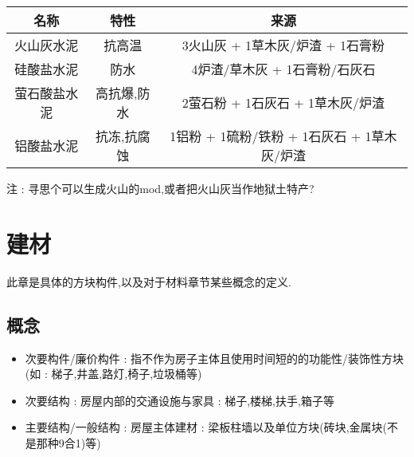 {{{          \begin{center}
              \begin{tabular}{|c|c|c|}
                  \hline
                  名称         & 特性        & 来源                                        \\
                  \hline
                  火山灰水泥   & 抗高温      & 3火山灰 + 1草木灰/炉渣 + 1石膏粉            \\
                  \hline
                  硅酸盐水泥   & 防水        & 4炉渣/草木灰 + 1石膏粉/石灰石               \\
                  \hline
                  萤石酸盐水泥 & 高抗爆,防水 & 2萤石粉 + 1石灰石 + 1草木灰/炉渣            \\
                  \hline
                  铝酸盐水泥   & 抗冻,抗腐蚀 & 1铝粉 + 1硫粉/铁粉 + 1石灰石 + 1草木灰/炉渣 \\
                  \hline
              \end{tabular}
          \end{center}

          注 : 寻思个可以生成火山的mod,或者把火山灰当作地狱土特产?
      }\label{cement}

  }
 }

\section{建材}{
  此章是具体的方块构件,以及对于材料章节某些概念的定义.

  \subsection{概念}{
      \begin{itemize}
          \item 次要构件/廉价构件 : 指不作为房子主体且使用时间短的的功能性/装饰性方块(如 : 梯子,井盖,路灯,椅子,垃圾桶等)
          \item 次要结构 : 房屋内部的交通设施与家具 : 梯子,楼梯,扶手,箱子等
          \item 主要结构/一般结构 : 房屋主体建材 : 梁板柱墙以及单位方块(砖块,金属块(不是那种9合1)等)
      \end{itemize}
  }

 }